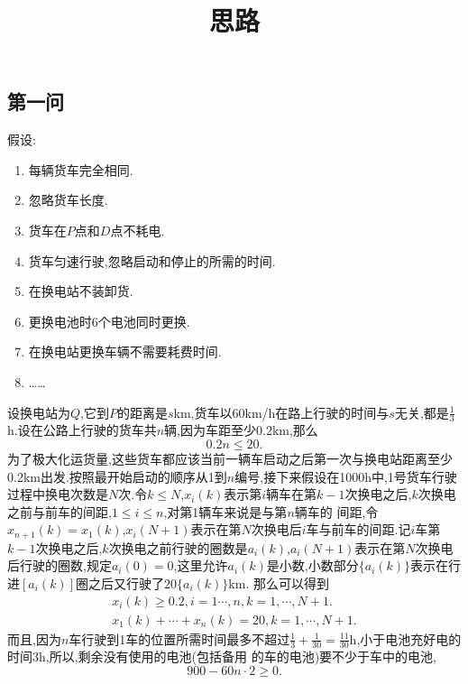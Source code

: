 \documentclass[12pt,a4paper,oneside]{ctexart}
\title{思路}
\date{}
\author{}
\begin{document}
  \maketitle

\subsection*{第一问}

假设:
\begin{enumerate}
  \item 每辆货车完全相同.
  \item 忽略货车长度.
  \item 货车在$P$点和$D$点不耗电.
  \item 货车匀速行驶,忽略启动和停止的所需的时间.
  \item 在换电站不装卸货.
  \item 更换电池时6个电池同时更换.
  \item 在换电站更换车辆不需要耗费时间.
  \item ……
\end{enumerate}

设换电站为$Q$,它到$P$的距离是$s$km,货车以60km/h在路上行驶的时间与$s$无关,都是$\frac{1}{3}$h.设在公路上行驶的货车共$n$辆,因为车距至少$0.2$km,那么
\begin{equation}
  0.2n\leqslant 20.
\end{equation}
为了极大化运货量,这些货车都应该当前一辆车启动之后第一次与换电站距离至少0.2km出发.按照最开始启动的顺序从1到$n$编号,接下来假设在1000h中,1号货车行驶过程中换电次数是$N$次.令$k\leqslant N$,$x_i(k)$表示第$i$辆车在第$k-1$次换电之后,$k$次换电之前与前车的间距,$1\leqslant i\leqslant n$,对第1辆车来说是与第$n$辆车的 
间距,令$x_{n+1}(k)=x_1(k)$,$x_{i}(N+1)$表示在第$N$次换电后$i$车与前车的间距.记$i$车第$k-1$次换电之后,$k$次换电之前行驶的圈数是$a_i(k)$,$a_i(N+1)$表示在第$N$次换电后行驶的圈数,规定$a_i(0)=0$,这里允许$a_i(k)$是小数,小数部分$\{a_i(k)\}$表示在行进$[a_i(k)]$圈之后又行驶了$20\{a_i(k)\}$km.
那么可以得到
\begin{gather}
  x_i(k)\geqslant 0.2,i=1\cdots,n,k=1,\cdots,N+1.\\
  x_1(k)+\cdots+x_n(k)=20,k=1,\cdots,N+1.
\end{gather}
而且,因为$n$车行驶到1车的位置所需时间最多不超过$\frac{1}{3}+\frac{1}{30}=\frac{11}{30}$h,小于电池充好电的时间3h,所以,剩余没有使用的电池(包括备用
的车的电池)要不少于车中的电池,
\begin{equation}
  900-60n\cdot 2\geqslant 0.
\end{equation}
\end{document}
